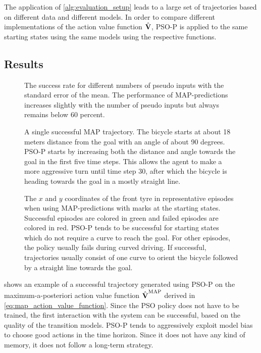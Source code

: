 The application of \cref{alg:evaluation_setup} leads to a large set of trajectories based on different data and different models.
In order to compare different implementations of the action value function $\operatorname{\hat{\operatorname{\mathbf{V}}}}$, PSO-P is applied to the same starting states using the same models using the respective functions.

\subsection{Results}
\begin{figure}[tp]
    \centering
    \caption[Results using MAP-predictions]{
        The success rate for different numbers of pseudo inputs with the standard error of the mean.
        The performance of MAP-predictions increases slightly with the number of pseudo inputs but always remains below 60 percent.
    }
    \label{fig:map_results}
\end{figure}
\begin{figure}[tp]
    \centering
    \caption[Successful MAP trajectory]{
        A single successful MAP trajectory.
        The bicycle starts at about 18 meters distance from the goal with an angle of about 90 degrees.
        PSO-P starts by increasing both the distance and angle towards the goal in the first five time steps.
        This allows the agent to make a more aggressive turn until time step 30, after which the bicycle is heading towards the goal in a mostly straight line.
    }
    \label{fig:map_successful_trajectory}
\end{figure}
\begin{figure}[p]
    \centering
    \caption[Episodes using MAP-predictions]{
        The $x$ and $y$ coordinates of the front tyre in representative episodes when using MAP-predictions with marks at the starting states.
        Successful episodes are colored in green and failed episodes are colored in red.
        PSO-P tends to be successful for starting states which do not require a curve to reach the goal.
        For other episodes, the policy usually fails during curved driving.
        If successful, trajectories usually consist of one curve to orient the bicycle followed by a straight line towards the goal.
    }
    \label{fig:map_trajectories}
\end{figure}
 shows an example of a successful trajectory generated using PSO-P on the maximum-a-posteriori action value function $\operatorname{\hat{\operatorname{\mathbf{V}}}}^{\text{MAP}}$ derived in \cref{eq:map_action_value_function}.
Since the PSO policy does not have to be trained, the first interaction with the system can be successful, based on the quality of the transition models.
PSO-P tends to aggressively exploit model bias to choose good actions in the time horizon.
Since it does not have any kind of memory, it does not follow a long-term strategy.

